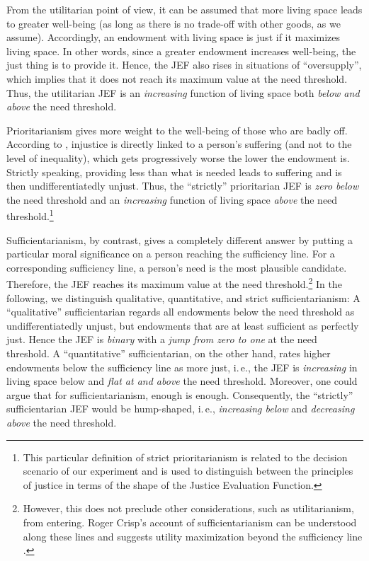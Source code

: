 \documentclass[12pt]{scrartcl}
\begin{document}
From the utilitarian point of view, it can be assumed that more living space leads to greater well-being (as long as there is no trade-off with other goods, as we assume).
Accordingly, an endowment with living space is just if it maximizes living space.
In other words, since a greater endowment increases well-being, the just thing is to provide it.
Hence, the JEF also rises in situations of ``oversupply'', which implies that it does not reach its maximum value at the need threshold.
Thus, the utilitarian JEF is an \textit{increasing} function of living space both \textit{below and above} the need threshold.

Prioritarianism gives more weight to the well-being of those who are badly off.
According to \citet{arneson_egalitarianism_2002}, injustice is directly linked to a person's suffering (and not to the level of inequality), which gets progressively worse the lower the endowment is.
Strictly speaking, providing less than what is needed leads to suffering and is then undifferentiatedly unjust.
Thus, the ``strictly'' prioritarian JEF is \textit{zero below} the need threshold and an \textit{increasing} function of living space \textit{above} the need threshold.\footnote{This particular definition of strict prioritarianism is related to the decision scenario of our experiment and is used to distinguish between the principles of justice in terms of the shape of the Justice Evaluation Function.}

Sufficientarianism, by contrast, gives a completely different answer by putting a particular moral significance on a person reaching the sufficiency line.
For a corresponding sufficiency line, a person's need is the most plausible candidate.
Therefore, the JEF reaches its maximum value at the need threshold.\footnote{However, this does not preclude other considerations, such as utilitarianism, from entering. Roger Crisp's \citeyearpar{crisp_egalitarianism_2003} account of sufficientarianism can be understood along these lines and suggests utility maximization beyond the sufficiency line \citep[see][]{arneson_egalitarianism_2002}.}
In the following, we distinguish qualitative, quantitative, and strict sufficientarianism:
A ``qualitative'' sufficientarian regards all endowments below the need threshold as undifferentiatedly unjust, but endowments that are at least sufficient as perfectly just.
Hence the JEF is \textit{binary} with a \textit{jump from zero to one} at the need threshold.
A ``quantitative'' sufficientarian, on the other hand, rates higher endowments below the sufficiency line as more just, i.\,e., the JEF is \textit{increasing} in living space below and \textit{flat at and above} the need threshold.
Moreover, one could argue that for sufficientarianism, enough is enough.
Consequently, the ``strictly'' sufficientarian JEF would be hump-shaped, i.\,e., \textit{increasing below} and \textit{decreasing above} the need threshold.
\end{document}
